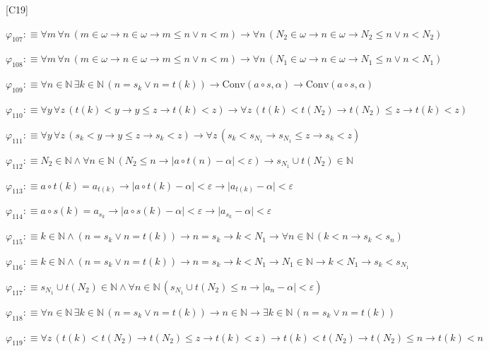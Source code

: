\begin{fullproof}{[C19]}
\begin{abbrevlist}
\item $\varphi_{107} :\equiv \forall m\,\forall n\,(m \in \omega \to n \in \omega \to m \leq n \lor n < m) \to \forall n\,(N_{2} \in \omega \to n \in \omega \to N_{2} \leq n \lor n < N_{2})$
\item $\varphi_{108} :\equiv \forall m\,\forall n\,(m \in \omega \to n \in \omega \to m \leq n \lor n < m) \to \forall n\,(N_{1} \in \omega \to n \in \omega \to N_{1} \leq n \lor n < N_{1})$
\item $\varphi_{109} :\equiv \forall n \in \mathbb{N}\,\exists k \in \mathbb{N}\,(n = s_{k} \lor n = t(k)) \to \mathrm{Conv}(a \circ s,\alpha) \to \mathrm{Conv}(a \circ s,\alpha)$
\item $\varphi_{110} :\equiv \forall y\,\forall z\,(t(k) < y \to y \leq z \to t(k) < z) \to \forall z\,(t(k) < t(N_{2}) \to t(N_{2}) \leq z \to t(k) < z)$
\item $\varphi_{111} :\equiv \forall y\,\forall z\,(s_{k} < y \to y \leq z \to s_{k} < z) \to \forall z\,(s_{k} < s_{N_{1}} \to s_{N_{1}} \leq z \to s_{k} < z)$
\item $\varphi_{112} :\equiv N_{2} \in \mathbb{N} \land \forall n \in \mathbb{N}\,(N_{2} \leq n \to \lvert a \circ t(n) - \alpha \rvert < \varepsilon) \to s_{N_{1}} \cup t(N_{2}) \in \mathbb{N}$
\item $\varphi_{113} :\equiv a \circ t(k) = a_{t(k)} \to \lvert a \circ t(k) - \alpha \rvert < \varepsilon \to \lvert a_{t(k)} - \alpha \rvert < \varepsilon$
\item $\varphi_{114} :\equiv a \circ s(k) = a_{s_{k}} \to \lvert a \circ s(k) - \alpha \rvert < \varepsilon \to \lvert a_{s_{k}} - \alpha \rvert < \varepsilon$
\item $\varphi_{115} :\equiv k \in \mathbb{N} \land (n = s_{k} \lor n = t(k)) \to n = s_{k} \to k < N_{1} \to \forall n \in \mathbb{N}\,(k < n \to s_{k} < s_{n})$
\item $\varphi_{116} :\equiv k \in \mathbb{N} \land (n = s_{k} \lor n = t(k)) \to n = s_{k} \to k < N_{1} \to N_{1} \in \mathbb{N} \to k < N_{1} \to s_{k} < s_{N_{1}}$
\item $\varphi_{117} :\equiv s_{N_{1}} \cup t(N_{2}) \in \mathbb{N} \land \forall n \in \mathbb{N}\,(s_{N_{1}} \cup t(N_{2}) \leq n \to \lvert a_{n} - \alpha \rvert < \varepsilon)$
\item $\varphi_{118} :\equiv \forall n \in \mathbb{N}\,\exists k \in \mathbb{N}\,(n = s_{k} \lor n = t(k)) \to n \in \mathbb{N} \to \exists k \in \mathbb{N}\,(n = s_{k} \lor n = t(k))$
\item $\varphi_{119} :\equiv \forall z\,(t(k) < t(N_{2}) \to t(N_{2}) \leq z \to t(k) < z) \to t(k) < t(N_{2}) \to t(N_{2}) \leq n \to t(k) < n$

\end{abbrevlist}
\end{fullproof}
